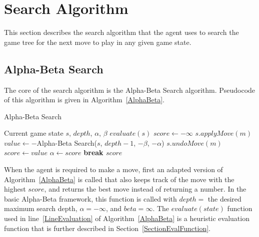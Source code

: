 \documentclass{article}
\newcommand{\refalgorithm}[1]{Algorithm~\ref{#1}}
\newcommand{\refalgorithmline}[2]{line~\ref{#1} of \refalgorithm{#2}}
\newcommand{\refsection}[1]{Section~\ref{#1}}
\begin{document}
\section{Search Algorithm} \label{SectionSearch}
This section describes the search algorithm that the agent uses to search the game tree for the next move to play in any given game state.

\subsection{Alpha-Beta Search}
The core of the search algorithm is the Alpha-Beta Search algorithm. Pseudocode of this algorithm is given in \refalgorithm{AlphaBeta}.
\begin{algorithm}
\caption{Alpha-Beta Search}
\label{AlphaBeta}
\begin{algorithmic}[1]
\REQUIRE Current game state $s$, $depth$, $\alpha$, $\beta$
		\RETURN $evaluate(s)$ \label{LineEvaluation}
	\ENDIF
	\STATE $score \leftarrow -\infty$
		\STATE $s.applyMove(m)$
		\STATE $value \leftarrow -$Alpha-Beta Search($s$, $depth - 1$, $-\beta$, $-\alpha$)
		\STATE $s.undoMove(m)$
			\STATE $score \leftarrow value$
		\ENDIF
			\STATE $\alpha \leftarrow score$
		\ENDIF
			\STATE \bf{break}
		\ENDIF
	\ENDFOR
	\RETURN $score$
\end{algorithmic}
\end{algorithm}
When the agent is required to make a move, first an adapted version of \refalgorithm{AlphaBeta} is called that also keeps track of the move with the highest $score$, and returns the best move instead of returning a number. In the basic Alpha-Beta framework, this function is called with $depth = $ the desired maximum search depth, $\alpha = -\infty$, and $beta = \infty$. The $evaluate(state)$ function used in \refalgorithmline{LineEvaluation}{AlphaBeta} is a heuristic evaluation function that is further described in \refsection{SectionEvalFunction}.
\end{document}
